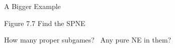 

\begin{frame}[standout]
A Bigger Example
\end{frame}

\begin{frame}{Figure 7.7}
Find the SPNE
\bsk
\centering
\begin{gametree}[player names={1, 2, 3}, scale=1.08]
  \figsevenseven
\end{gametree}
\bsk
\raggedright
How many proper subgames?  \ Any pure NE in them? 
\vspace{-0.3in}
\end{frame}

